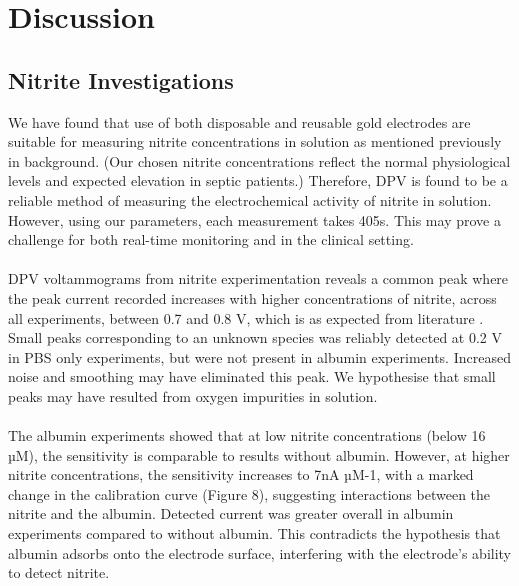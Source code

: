 \section{Discussion}

\subsection{Nitrite Investigations}
We have found that use of both disposable and reusable gold electrodes are suitable for measuring nitrite concentrations in solution as mentioned previously in background. (Our chosen nitrite concentrations reflect the normal physiological levels and expected elevation in septic patients.) Therefore, DPV is found to be a reliable method of measuring the electrochemical activity of nitrite in solution. However, using our parameters, each measurement takes 405s. This may prove a challenge for both real-time monitoring and in the clinical setting.\\\\
DPV voltammograms from nitrite experimentation reveals a common peak where the peak current recorded increases with higher concentrations of nitrite, across all experiments, between 0.7 and 0.8 V, which is as expected from literature \cite{article}. Small peaks corresponding to an unknown species was reliably detected at 0.2 V in PBS only experiments, but were not present in albumin experiments. Increased noise and smoothing may have eliminated this peak. We hypothesise that small peaks may have resulted from oxygen impurities in solution.\\\\ 
The albumin experiments showed that at low nitrite concentrations (below 16 µM), the sensitivity is comparable to results without albumin. However, at higher nitrite concentrations, the sensitivity increases to 7nA µM-1, with a marked change in the calibration curve (Figure 8), suggesting interactions between the nitrite and the albumin. Detected current was greater overall in albumin experiments compared to without albumin. This contradicts the hypothesis that albumin adsorbs onto the electrode surface, interfering with the electrode's ability to detect nitrite.

